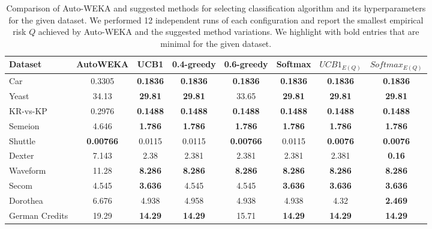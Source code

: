 \documentclass{svproc}
\begin{document}
\begin{table}[t]
\caption{Comparison of Auto-WEKA and suggested methods for selecting classification algorithm and its hyperparameters for the given dataset. We performed 12 independent runs of each configuration and report the smallest empirical risk $Q$ achieved by Auto-WEKA and the suggested method variations. We highlight with bold entries that are minimal for the given dataset.}\label{tab:res}
\tabcolsep=2pt
\begin{center}
\begin{tabular}{|l|c|c|c|c|c|c|c|}
\hline 
\small{Dataset} & \small{AutoWEKA} & \small{UCB1} & \small{0.4-greedy} & \small{0.6-greedy} & \small{Softmax} & \small{$UCB1_{E(Q)}$} & \small{$Softmax_{E(Q)}$} \\
\hline
\small Car & \small 0.3305 & \bf \small 0.1836 & \bf \small 0.1836 & \bf  \small 0.1836 & \bf \small 0.1836 & \bf \small 0.1836 & \bf \small 0.1836 \\
\hline
\small Yeast & \small 34.13 & \bf \small 29.81 & \bf \small 29.81 & \small 33.65 & \bf \small 29.81 & \bf \small 29.81 & \bf \small 29.81 \\
\hline
\small KR-vs-KP & \small 0.2976 & \bf \small 0.1488 & \bf \small 0.1488 & \bf \small 0.1488 & \bf \small 0.1488 & \bf \small 0.1488 & \bf \small 0.1488 \\
\hline
\small Semeion & \small 4.646 & \bf \small 1.786 & \bf \small 1.786 & \bf \small 1.786 & \bf \small 1.786 & \bf \small 1.786 & \bf \small 1.786 \\
\hline
\small Shuttle & \bf \small 0.00766 & \small 0.0115 & \small 0.0115 & \bf \small 0.00766 & \small 0.0115 & \bf \small 0.0076 & \bf \small 0.0076 \\
\hline
\small Dexter & \small 7.143 & \small 2.38 & \small 2.381 &  \small 2.381 & \small 2.381 & \small 2.381 & \bf \small 0.16 \\
\hline
\small Waveform  & \small 11.28 & \bf \small 8.286 & \bf \small 8.286 & \bf \small 8.286 & \bf \small 8.286 & \bf \small 8.286 & \bf \small 8.286 \\
\hline
\small Secom  & \small 4.545 & \bf \small 3.636 & \small 4.545 & \small 4.545 & \bf \small 3.636 &  \bf \small 3.636 & \bf \small 3.636 \\
\hline
\small Dorothea  & \small 6.676 & \small 4.938 & \small 4.958 & \small 4.938 & \small 4.938 & \small 4.32 & \bf \small 2.469 \\
\hline
\small German Credits  & \small 19.29 & \bf \small 14.29 & \bf \small 14.29 & \small 15.71 & \bf \small 14.29 & \bf \small 14.29 & \bf \small 14.29\\
\hline
\end{tabular}
\end{center}
\end{table}
\end{document}
